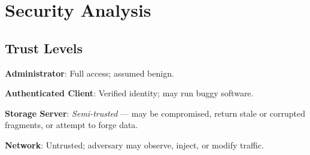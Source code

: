 \documentclass[10pt]{article}
\begin{document}
\section{Security Analysis}

\subsection{Trust Levels}

\textbf{Administrator}: Full access; assumed benign.

\textbf{Authenticated Client}: Verified identity; may run buggy software.

\textbf{Storage Server}: \emph{Semi-trusted} — may be compromised, return stale or corrupted fragments, or attempt to forge data.

\textbf{Network}: Untrusted; adversary may observe, inject, or modify traffic.


\end{document}
